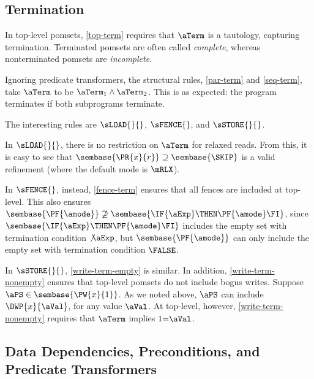 \subsection{Termination}
\label{sec:ex:term}

In top-level pomsets, \ref{top-term} requires that $\aTerm$ is a tautology,
capturing termination.  Terminated pomsets are often called \emph{complete},
whereas nonterminated pomsets are \emph{incomplete}.

Ignoring predicate transformers, the structural rules, \ref{par-term} and
\ref{seq-term}, take $\aTerm$ to be $\aTerm_1\land\aTerm_2$.  This is as
expected: the program terminates if both subprograms terminate.

The interesting rules are $\sLOAD{}{}$, $\sFENCE{}$, and $\sSTORE{}{}$.


In $\sLOAD{}{}$, there is no restriction on $\aTerm$ for relaxed reads.  From
this, it is easy to see that
\begin{math}
  \sembase{\PR{x}{r}}
  \supseteq
  \sembase{\SKIP}
\end{math}
is a valid refinement (where the default mode is $\mRLX$).

In $\sFENCE{}$, instead, \ref{fence-term} ensures that all fences are included at
top-level.  This also ensures
$\sembase{\PF{\amode}}\not\supseteq\sembase{\IF{\aExp}\THEN\PF{\amode}\FI}$,
since $\sembase{\IF{\aExp}\THEN\PF{\amode}\FI}$ includes the empty set with
termination condition $\not\aExp$, but $\sembase{\PF{\amode}}$ can only
include the empty set with termination condition $\FALSE$.

In $\sSTORE{}{}$, \ref{write-term-empty} is similar.  In addition,
\ref{write-term-nonempty} ensures that top-level pomsets do not include bogus
writes.  Suppose $\aPS\in\sembase{\PW{x}{1}}$.  As we noted above, $\aPS$ can
include $\DWP{x}{\aVal}$, for any value $\aVal$.  At top-level, however,
\ref{write-term-nonempty} requires that $\aTerm$ implies $1{=}\aVal$.


\subsection{Data Dependencies, Preconditions, and Predicate Transformers}
\label{sec:ex:data}



